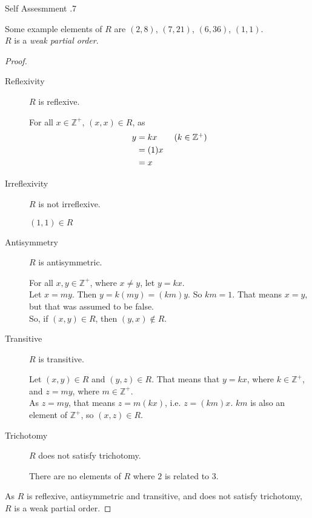 \documentclass[\main/notes.tex]{subfiles}
\begin{document}
\begin{exercise}{Self Assesmment \thechapter.7}
\begin{enumerate}
							Some example elements of $R$ are $(2, 8)$, $(7, 21)$, $(6, 36)$, $(1, 1)$.\\
							$R$ is a \emph{weak partial order}.
							\begin{proof}
								$ $
								\begin{description}
									\item[Reflexivity] $R$ is reflexive.
										\begin{subproof}
											For all $x \in \mathbb{Z}^{+}$, $(x, x) \in R$, as
											\begin{align*}
												y &= kx \tag*{$(k \in \mathbb{Z}^{+})$}\\
												&= (1)x\\
												&= x
											\end{align*}
										\end{subproof}
									\item[Irreflexivity] $R$ is not irreflexive.
										\begin{subproof}[Counterexample]
											$(1, 1) \in R$
										\end{subproof}
									\item[Antisymmetry] $R$ is antisymmetric.
										\begin{subproof}
											For all $x, y \in \mathbb{Z}^{+}$, where $x \neq y$, let $y = kx$.\\
											Let $x = my$. Then $y = k(my) = (km)y$. So $km = 1$. That means $x = y$, but that was assumed to be false.\\
											So, if $(x, y) \in R$, then $(y, x) \notin R$.
										\end{subproof}
									\item[Transitive] $R$ is transitive.
										\begin{subproof}
											Let $(x, y) \in R$ and $(y, z) \in R$. That means that $y = kx$, where $k \in \mathbb{Z}^{+}$, and $z = my$, where $m \in \mathbb{Z}^{+}$.\\
											As $z = my$, that means $z = m(kx)$, i.e. $z = (km)x$. $km$ is also an element of $\mathbb{Z}^{+}$, so $(x, z) \in R$.
										\end{subproof}
									\item[Trichotomy] $R$ does not satisfy trichotomy.
										\begin{subproof}[Counterexample]
											There are no elements of $R$ where $2$ is related to $3$.
										\end{subproof}
								\end{description}
								As $R$ is reflexive, antisymmetric and transitive, and does not satisfy trichotomy, $R$ is a weak partial order.
							\end{proof}
					\end{enumerate}
				\end{exercise}
		\pagebreak
\end{document}
